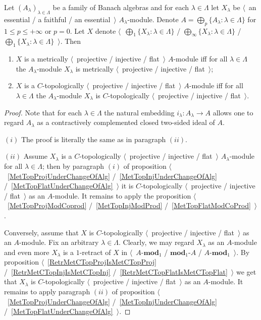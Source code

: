 \begin{proposition}\label{MetTopProjInjFlatUnderSumOfAlg} Let
${(A_\lambda)}_{\lambda\in\Lambda}$ be a family of Banach algebras and for each
$\lambda\in\Lambda$ let $X_\lambda$ be $\langle$~an essential / a faithful / an
essential~$\rangle$ $A_\lambda$-module. Denote $A=\bigoplus_p
\{A_\lambda:\lambda\in\Lambda \}$ for $1\leq p\leq +\infty$ or $p=0$. Let $X$
denote $\langle$~$\bigoplus_1 \{X_\lambda:\lambda\in\Lambda \}$ /
$\bigoplus_\infty \{X_\lambda:\lambda\in\Lambda \}$ / 
$\bigoplus_1 \{X_\lambda:\lambda\in\Lambda \}$~$\rangle$. Then

\begin{enumerate}[label = (\roman*)]
    \item $X$ is a metrically $\langle$~projective / injective / flat~$\rangle$
    $A$-module iff for all $\lambda\in\Lambda$ the $A_\lambda$-module
    $X_\lambda$ is metrically $\langle$~projective / injective / flat~$\rangle$;

    \item $X$ is a $C$-topologically $\langle$~projective / injective /
    flat~$\rangle$ $A$-module iff for all $\lambda\in\Lambda$ the
    $A_\lambda$-module $X_\lambda$ is $C$-topologically $\langle$~projective /
    injective / flat~$\rangle$.
\end{enumerate}
\end{proposition}
\begin{proof} Note that for each $\lambda\in\Lambda$ the natural embedding
$i_\lambda:A_\lambda\to A$ allows one to regard $A_\lambda$ as a contractively 
complemented closed two-sided ideal of $A$.

$(i)$ The proof is literally the same as in paragraph $(ii)$.

$(ii)$ Assume $X_\lambda$ is a $C$-topologically $\langle$~projective / injective
/ flat~$\rangle$ $A_\lambda$-module for all $\lambda\in\Lambda$; then by
paragraph $(i)$ of proposition $\langle$~\ref{MetTopProjUnderChangeOfAlg}
/~\ref{MetTopInjUnderChangeOfAlg} /~\ref{MetTopFlatUnderChangeOfAlg}~$\rangle$
it is $C$-topologically $\langle$~projective / injective / flat~$\rangle$ as
an $A$-module. It remains to apply the proposition
$\langle$~\ref{MetTopProjModCoprod} /~\ref{MetTopInjModProd}
/~\ref{MetTopFlatModCoProd}~$\rangle$. 

Conversely, assume that $X$ is $C$-topologically $\langle$~projective /
injective / flat~$\rangle$ as an $A$-module. Fix an arbitrary $\lambda\in\Lambda$.
Clearly, we may regard $X_\lambda$ as an $A$-module and even more $X_\lambda$ is a
$1$-retract of $X$ in $\langle$~$A\text{-}\mathbf{mod}_1$ / $\mathbf{mod}_1\text{-}A$ /
$A\text{-}\mathbf{mod}_1$~$\rangle$. By proposition
$\langle$~\ref{RetrMetCTopProjIsMetCTopProj} /~\ref{RetrMetCTopInjIsMetCTopInj}
/~\ref{RetrMetCTopFlatIsMetCTopFlat}~$\rangle$ we get that $X_\lambda$ is
$C$-topologically $\langle$~projective / injective / flat~$\rangle$ as
an $A$-module. It remains to apply paragraph $(ii)$ of proposition
$\langle$~\ref{MetTopProjUnderChangeOfAlg} /~\ref{MetTopInjUnderChangeOfAlg}
/~\ref{MetTopFlatUnderChangeOfAlg}~$\rangle$.
\end{proof} 

